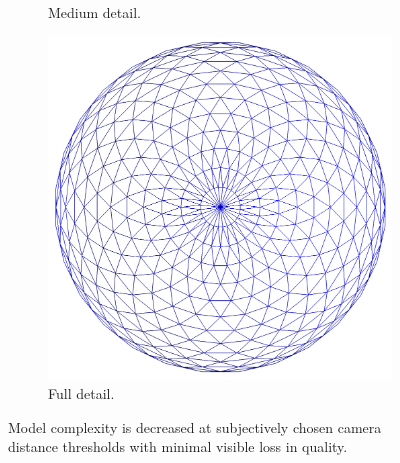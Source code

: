 \begin{figure}
\begin{center}
\begin{subfigure}{0.3\textwidth}
      \caption{Medium detail.}
      \label{fig:lod_2_w}
    \end{subfigure}
    \begin{subfigure}{0.3\textwidth}
      \includegraphics[width=\textwidth]{assets/images/lod/3_w}
      \caption{Full detail.}
      \label{fig:lod_3_w}
    \end{subfigure}
  \end{center}
  \caption{Model complexity is decreased at subjectively chosen camera distance thresholds with minimal visible loss in quality.}
  \label{fig:lod_distances}
\end{figure}

